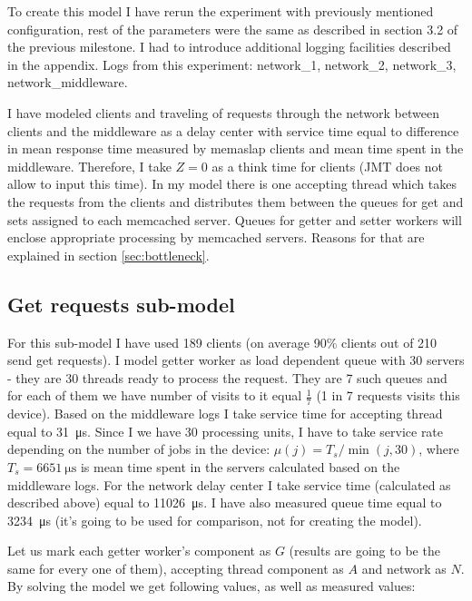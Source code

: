 \documentclass[11pt]{article}
\begin{document}
To create this model I have rerun the experiment with previously mentioned configuration, rest of the parameters were the same as described in section 3.2 of the previous milestone. I had to introduce additional logging facilities described in the appendix. Logs from this experiment: network\_1, network\_2, network\_3, network\_middleware.

I have modeled clients and traveling of requests through the network between clients and the middleware as a delay center with service time equal to difference in mean response time measured by memaslap clients and mean time spent in the middleware. Therefore, I take $Z=0$ as a think time for clients (JMT does not allow to input this time). In my model there is one accepting thread which takes the requests from the clients and distributes them between the queues for get and sets assigned to each memcached server. 
Queues for getter and setter workers will enclose appropriate processing by memcached servers. Reasons for that are explained in section \ref{sec:bottleneck}.

\subsection{Get requests sub-model}

For this sub-model I have used 189 clients (on average 90\% clients out of 210 send get requests). I model getter worker as load dependent queue with 30 servers - they are 30 threads ready to process the request. They are 7 such queues and for each of them we have number of visits to it equal $\frac{1}{7}$ (1 in 7 requests visits this device).
Based on the middleware logs I take service time for accepting thread equal to \SI{31}{\micro\second}.
Since I we have 30 processing units, I have to take service rate depending on the number of jobs in the device: $\mu(j) = T_s / \min(j, 30)$, where $T_s = \SI{6651}{\micro\second}$
is mean time spent in the servers calculated based on the middleware logs. 
For the network delay center I take service time (calculated as described above) equal to \SI{11026}{\micro\second}.
I have also measured queue time equal to \SI{3234}{\micro\second} (it's going to be used for comparison, not for creating the model).

Let us mark each getter worker's component as $G$ (results are going to be the same for every one of them), accepting thread component as $A$ and network as $N$. By solving the model we get following values, as well as measured values:
\end{document}

